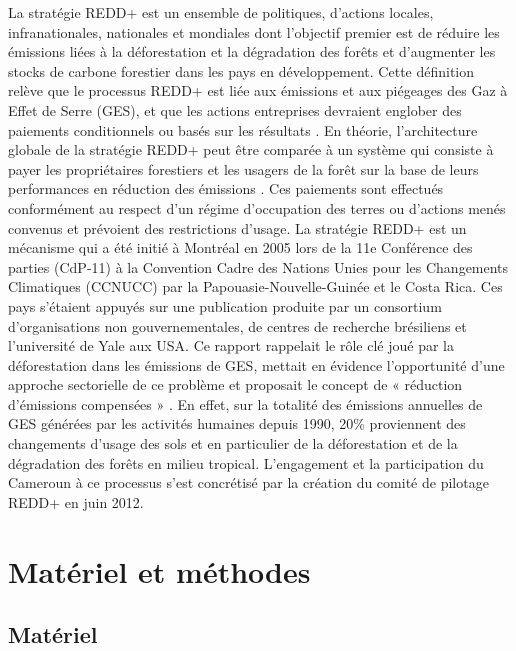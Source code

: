 \documentclass[
  12pt,
  a4paper,
  extrafontsizes,
  onecolumn,
  openright]{book}
\theoremstyle{definition}
\theoremstyle{definition}
\theoremstyle{definition}
\theoremstyle{definition}
\theoremstyle{remark}
\begin{document}
La stratégie REDD+ est un ensemble de politiques, d'actions locales, infranationales, nationales et mondiales dont l'objectif premier est de réduire les émissions liées à la déforestation et la dégradation des forêts et d'augmenter les stocks de carbone forestier dans les pays en développement. Cette définition relève que le processus REDD+ est liée aux émissions et aux piégeages des Gaz à Effet de Serre (GES), et que les actions entreprises devraient englober des paiements conditionnels ou basés sur les résultats \citep{Angelsen2013}. En théorie, l'architecture globale de la stratégie REDD+ peut être comparée à un système qui consiste à payer les propriétaires forestiers et les usagers de la forêt sur la base de leurs performances en réduction des émissions \citep{Angelsen2010}. Ces paiements sont effectués conformément au respect d'un régime d'occupation des terres ou d'actions menés convenus et prévoient des restrictions d'usage. La stratégie REDD+ est un mécanisme qui a été initié à Montréal en 2005 lors de la 11e Conférence des parties (CdP-11) à la Convention Cadre des Nations Unies pour les Changements Climatiques (CCNUCC) par la Papouasie-Nouvelle-Guinée et le Costa Rica. Ces pays s'étaient appuyés sur une publication produite par un consortium d'organisations non gouvernementales, de centres de recherche brésiliens et l'université de Yale aux USA. Ce rapport rappelait le rôle clé joué par la déforestation dans les émissions de GES, mettait en évidence l'opportunité d'une approche sectorielle de ce problème et proposait le concept de « réduction d'émissions compensées » \citep{Santilli2005}. En effet, sur la totalité des émissions annuelles de GES générées par les activités humaines depuis 1990, 20\% proviennent des changements d'usage des sols \citep{GIEC2007} et en particulier de la déforestation et de la dégradation des forêts en milieu tropical. L'engagement et la participation du Cameroun à ce processus s'est concrétisé par la création du comité de pilotage REDD+ en juin 2012.

\hypertarget{matuxe9riel-et-muxe9thodes}{%
\chapter{Matériel et méthodes}\label{matuxe9riel-et-muxe9thodes}}

\hypertarget{matuxe9riel}{%
\section{Matériel}\label{matuxe9riel}}
\end{document}
